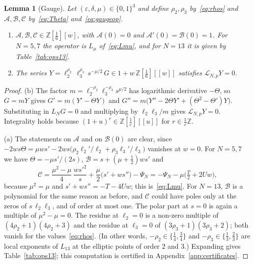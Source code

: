 \documentclass[11pt,a4paper]{article}
\newtheorem{lemma}[theorem]{Lemma}
\theoremstyle{definition}
\theoremstyle{remark}
\newcommand{\Z}{\mathbb{Z}}
\newcommand{\cL}{\mathcal{L}}
\newcommand{\cA}{\mathcal{A}}
\newcommand{\cB}{\mathcal{B}}
\newcommand{\cC}{\mathcal{C}}
\numberwithin{equation}{section}
\begin{document}
\begin{lemma}[Gauge]\label{lem:gauge}
Let $(\varepsilon,\delta,\mu)\in\{0,1\}^3$ and define $\rho_2,\rho_3$
by~\eqref{eq:rhos} and $\cA,\cB,\cC$ by~\eqref{eq:Theta}
and~\eqref{eq:gaugeop}.
\begin{enumerate}
\item[(a)] $\cA,\cB,\cC\in\Z[\frac16][w]$, with $\cA(0)=0$ and
$\cA'(0)=\cB(0)=1$. For $N=5,7$ the operator is $L_\mu$ of~\eqref{eq:Lmu},
and for $N=13$ it is given by Table~\ref{tab:ops13}.
\item[(b)] The series
$Y=\ell_2^{\rho_2}\,\ell_3^{\rho_3}\,s^{-\mu/2}\,G\in1+w\,\Z[\tfrac16][[w]]$
satisfies $\cL_{N,p}Y=0$.
\end{enumerate}
\end{lemma}
\begin{proof}
(b) The factor $m=\ell_2^{-\rho_2}\ell_3^{-\rho_3}s^{\mu/2}$ has logarithmic
derivative $-\Theta$, so $G=mY$ gives $G'=m(Y'-\Theta Y)$ and
$G''=m\bigl(Y''-2\Theta Y'+(\Theta^2-\Theta')Y\bigr)$. Substituting in
$L_NG=0$ and multiplying by $\ell_2\ell_3/m$ gives $\cL_{N,p}Y=0$.
Integrality holds because $(1+u)^{r}\in\Z[\frac1c][[u]]$ for $r\in\frac1c\Z$.

(a) The statements on $\cA$ and on $\cB(0)$ are clear, since
$-2ws\Theta=\mu ws'-2ws\bigl(\rho_2\ell_2'/\ell_2+\rho_3\ell_3'/\ell_3\bigr)$
vanishes at $w=0$. For $N=5,7$ we have $\Theta=-\mu s'/(2s)$,
$\cB=s+(\mu+\frac12)ws'$ and
\[
\cC=\frac{\mu^2-\mu}{4}\,\frac{ws'^2}{s}+\frac\mu2\bigl(s'+ws''\bigr)-\Psi_N
=-\Psi_N-\mu\bigl(\tfrac T2+2Uw\bigr),
\]
because $\mu^2=\mu$ and $s'+ws''=-T-4Uw$; this is~\eqref{eq:Lmu}. For $N=13$,
$\cB$ is a polynomial for the same reason as before, and $\cC$ could have
poles only at the zeros of $s\,\ell_2\ell_3$, and of order at most one. The polar part at $s=0$ is
again a multiple of $\mu^2-\mu=0$. The residue at $\ell_2=0$ is a non-zero
multiple of $(4\rho_2+1)(4\rho_2+3)$ and the residue at $\ell_3=0$ of
$(3\rho_3+1)(3\rho_3+2)$; both vanish for the values~\eqref{eq:rhos}. (In
other words, $-\rho_2\in\{\frac14,\frac34\}$ and
$-\rho_3\in\{\frac13,\frac23\}$ are local exponents of $L_{13}$ at the elliptic
points of order $2$ and $3$.) Expanding gives Table~\ref{tab:ops13}; this
computation is certified in Appendix~\ref{app:certificates}.
\end{proof}
\end{document}
